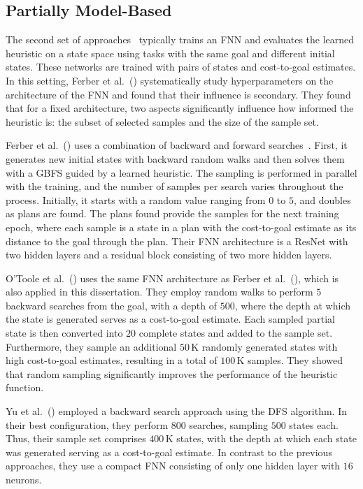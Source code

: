 \subsection{Partially Model-Based}

The second set of approaches~\cite{Ferber.etal/2020a, Yu.etal/2020, Ferber.etal/2022, OToole/2022} typically trains an FNN and evaluates the learned heuristic on a state space using tasks with the same goal and different initial states. These networks are trained with pairs of states and cost-to-goal estimates. In this setting, Ferber et al.~(\citeyear{Ferber.etal/2020a}) systematically study hyperparameters on the architecture of the FNN and found that their influence is secondary. They found that for a fixed architecture, two aspects significantly influence how informed the heuristic is: the subset of selected samples and the size of the sample set. 

Ferber et al.~(\citeyear{Ferber.etal/2022}) uses a combination of backward and forward searches~\cite{Arfaee.etal/2011}. First, it generates new initial states with backward random walks and then solves them with a GBFS guided by a learned heuristic. The sampling is performed in parallel with the training, and the number of samples per search varies throughout the process. Initially, it starts with a random value ranging from $0$ to $5$, and doubles as plans are found. The plans found provide the samples for the next training epoch, where each sample is a state in a plan with the cost-to-goal estimate as its distance to the goal through the plan. Their FNN architecture is a ResNet with two hidden layers and a residual block consisting of two more hidden layers.

O'Toole et al.~(\citeyear{OToole/2022}) uses the same FNN architecture as Ferber et al.~(\citeyear{Ferber.etal/2022}), which is also applied in this dissertation. They employ random walks to perform $5$ backward searches from the goal, with a depth of $500$, where the depth at which the state is generated serves as a cost-to-goal estimate. Each sampled partial state is then converted into $20$ complete states and added to the sample set. Furthermore, they sample an additional $50$\,K randomly generated states with high cost-to-goal estimates, resulting in a total of $100$\,K samples. They showed that random sampling significantly improves the performance of the heuristic function.

Yu et al.~(\citeyear{Yu.etal/2020}) employed a backward search approach using the DFS algorithm. In their best configuration, they perform $800$ searches, sampling $500$ states each. Thus, their sample set comprises $400$\,K states, with the depth at which each state was generated serving as a cost-to-goal estimate. In contrast to the previous approaches, they use a compact FNN consisting of only one hidden layer with $16$ neurons.

